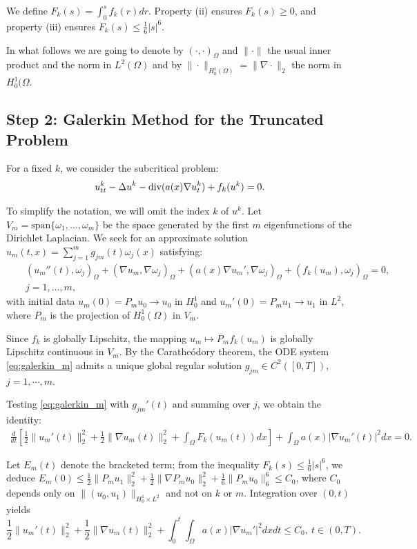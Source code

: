 \documentclass[11pt,letterpaper]{amsart}
\begin{document}
We define $F_k(s) = \int_0^s f_k(r) dr$. Property (ii) ensures $F_k(s) \ge 0$, and property (iii) ensures $F_k(s) \le \frac{1}{6}|s|^6$.

In what follows we are going to denote by $(\cdot, \cdot)_\Omega$ and $\|\cdot\|$ the usual inner product and the norm in $L^2(\Omega)$ and by $\|\cdot\|_{H_0^1(\Omega)}=\|\nabla \cdot\|_2$ the norm in $H_0^1(\Omega$.

\subsection{Step 2: Galerkin Method for the Truncated Problem}

For a fixed $k$, we consider the subcritical problem:
\begin{equation}\label{eq:truncated}
u_{tt}^k - \Delta u^k - \hbox{div}(a(x) \nabla u_t^k) + f_k(u^k) = 0.
\end{equation}

To simplify the notation, we will omit the index $k$ of $u^k$. Let $V_m = \text{span}\{\omega_1, \dots, \omega_m\}$ be the space generated by the first $m$ eigenfunctions of the Dirichlet Laplacian. We seek for an approximate solution $u_m(t,x) = \sum_{j=1}^m g_{jm}(t) \omega_j(x)$ satisfying:
\begin{eqnarray}\label{eq:galerkin_m}
&&(u_m''(t), \omega_j)_{\Omega} + (\nabla u_m, \nabla \omega_j)_\Omega + (a(x) \nabla u_m', \nabla \omega_j)_\Omega + (f_k(u_m), \omega_j)_\Omega = 0,\\
 &&j=1,\dots,m,\nonumber
\end{eqnarray}
with initial data $u_m(0) = P_m u_0 \to u_0$ in $H_0^1$ and $u_m'(0) = P_m u_1 \to u_1$ in $L^2$, where $P_m$ is the projection of $H_0^1(\Omega)$ in $V_m$.

Since $f_k$ is globally Lipschitz, the mapping $u_m \mapsto P_m f_k(u_m)$ is globally Lipschitz continuous in $V_m$. By the Caratheódory theorem, the ODE system \eqref{eq:galerkin_m} admits a unique global regular solution $g_{jm} \in C^2([0,T])$, $j=1, \cdots,m$.

Testing \eqref{eq:galerkin_m} with $g_{jm}'(t)$ and summing over $j$, we obtain the identity:
\begin{eqnarray*}
\frac{d}{dt} \left[ \frac{1}{2}\|u_m'(t)\|_2^2 + \frac{1}{2}\|\nabla u_m(t)\|_2^2 + \int_\Omega F_k(u_m(t)) dx \right] + \int_\Omega a(x) |\nabla u_m'(t)|^2 dx = 0.
\end{eqnarray*}

Let $E_m(t)$ denote the bracketed term; from the inequality $F_k(s) \le \frac{1}{6}|s|^6$, we deduce $E_m(0) \le \frac{1}{2}\|P_m u_1\|_2^2 + \frac{1}{2}\|\nabla P_m u_0\|_2^2 + \frac{1}{6}\|P_m u_0\|_6^6 \le C_0$, where $C_0$ depends only on $\|(u_0,u_1)\|_{H_0^1 \times L^2}$ and not on $k$ or $m$. Integration over $(0,t)$ yields
\begin{equation}\label{eq:unif_m}
\frac12\|u_m'(t)\|_2^2 + \frac12\|\nabla u_m(t)\|_2^2 + \int_0^t \int_\Omega a(x) |\nabla u_m'|^2 dx dt \le C_0,~t\in (0,T).
\end{equation}
\end{document}
